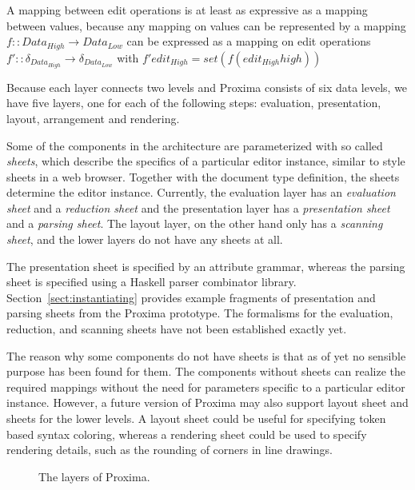 A mapping between edit operations is at least as expressive as a mapping between values, because any 
mapping on values can be represented by a mapping 
$f :: Data_{High} \rightarrow Data_{Low}$ can be expressed as a mapping on edit operations
$f' ::  \delta_{Data_{High}} \rightarrow \delta_{Data_{Low}}$ with $f' edit_{High} = set (f (edit_{High}high))$
\ec


Because each layer connects two levels and Proxima  consists of six data levels, we have five layers, one for each of the following steps: evaluation, presentation, layout, arrangement and rendering.

Some of the components in the architecture are parameterized with so called {\em sheets}, which describe the specifics of a particular editor instance, similar to style sheets in a web browser. Together with the document type definition, the sheets determine the editor instance. Currently, the evaluation layer has an {\em evaluation sheet} and a {\em reduction sheet} and the presentation layer has a {\em presentation sheet} and a {\em parsing sheet}.  The layout layer, on the other hand only has a {\em scanning sheet}, and the lower layers do not have any sheets at all. 

The presentation sheet is specified by an attribute grammar, whereas the parsing sheet is specified using a Haskell parser combinator library. Section~\ref{sect:instantiating} provides example fragments of presentation and parsing sheets from the Proxima prototype. The formalisms for the evaluation, reduction, and scanning sheets have not been established exactly yet.

The reason why some components do not have sheets is that as of yet no sensible purpose has been found for them. The components without sheets can realize the required mappings without the need for parameters specific to a particular editor instance. However, a future version of Proxima may also support layout sheet and sheets for the lower levels. A layout sheet could be useful for specifying token based syntax coloring, whereas a rendering sheet could be used to specify rendering details, such as the rounding of corners in line drawings.

\begin{figure}
\begin{small}
\begin{center}
\begin{center}
\end{center}\caption{The layers of Proxima.}\label{proxLayers} 
\end{center}
\end{small}
\end{figure}

